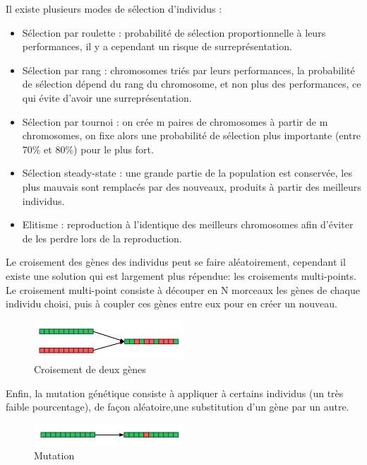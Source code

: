	Il existe plusieurs modes de sélection d'individus :
	\begin{itemize}
	\item Sélection par roulette : probabilité de sélection proportionnelle à leurs performances, il y a cependant un risque de surreprésentation.
	\item Sélection par rang : chromosomes triés par leurs performances, la probabilité de sélection dépend du rang du chromosome, et non plus des performances, ce qui évite d'avoir une surreprésentation.
	\item Sélection par tournoi : on crée m paires de chromosomes à partir de m chromosomes, on fixe alors une probabilité de sélection plus importante (entre 70\% et 80\%) pour le plus fort. 
	\item Sélection steady-state : une grande partie de la population est conservée, les plus mauvais sont remplacés par des nouveaux, produits à partir des meilleurs individus.
	\item Elitisme : reproduction à l'identique des meilleurs chromosomes afin d'éviter de les perdre lors de la reproduction.\\
	\end{itemize}
	
	
	Le croisement des gènes des individus peut se faire aléatoirement, cependant il existe une solution qui est largement plus répendue: les croisements multi-points. Le croisement multi-point consiste à découper en N morceaux les gènes de chaque individu choisi, puis à coupler ces gènes entre eux pour en créer un nouveau.\\
	\begin{figure}[H]

	\includegraphics[width=0.5\textwidth]{./pictures/reproduction.png}
	
	\caption{Croisement de deux gènes}
	\end{figure}
	Enfin, la mutation génétique consiste à appliquer à certains individus (un très faible pourcentage), de façon aléatoire,une substitution d'un gène par un autre.\\
	\begin{figure}[H]

	\includegraphics[width=0.5\textwidth]{./pictures/mutation.png}
	
	\caption{Mutation}
	\end{figure}
	

